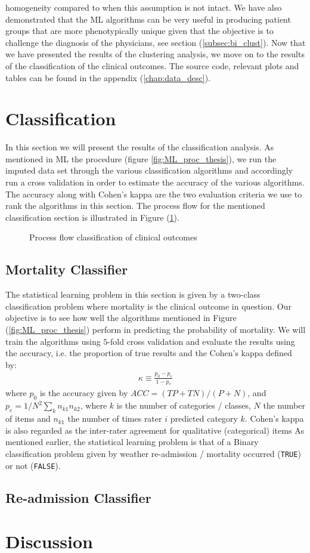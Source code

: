 \documentclass[../thesis.tex]{subfiles}
\begin{document}
homogeneity compared to when this assumption is not intact. We have also demonstrated that the ML algorithms can be very useful in producing patient groups that are more phenotypically unique given that the objective is to challenge the diagnosis of the physicians, see section (\ref{subsec:bi_clust}). Now that we have presented the results of the clustering analysis, we move on to the results of the classification of the clinical outcomes. The source code, relevant plots and tables can be found in the appendix (\ref{chap:data_desc}).

\section{Classification}

\noindent In this section we will present the results of the classification analysis. As mentioned in ML the procedure (figure \ref{fig:ML_proc_thesis}), we run the imputed data set through the various classification algorithms and accordingly run a cross validation in order to estimate the accuracy of the various algorithms. The accuracy along with Cohen’s kappa are the two evaluation criteria we use to rank the algorithms in this section. The process flow for the mentioned classification section is illustrated in Figure (\ref{fig:process_flow_classification}). 

\begin{figure}
    \centering
    
    \caption{Process flow classification of clinical outcomes}
    \label{fig:process_flow_classification}
\end{figure}

\subsection{Mortality Classifier}

\noindent The statistical learning problem in this section is given by a two-class classification problem where mortality is the clinical outcome in question. Our objective is to see how well the algorithms mentioned in Figure (\ref{fig:ML_proc_thesis}) perform in predicting the probability of mortality. We will train the algorithms using $5$-fold cross validation and evaluate the results using the accuracy, i.e. the proportion of true results and the Cohen's kappa defined by:
\begin{align}
    \kappa \equiv \frac{p_0 - p_e}{1 - p_e}
\end{align}
where $p_0$ is the accuracy given by ${\mathit  {ACC}}=({\mathit  {TP}}+{\mathit  {TN}})/(P+N)$, and $p_e = 1 / N^2 \sum_{k} n_{k1}n_{k2}$, where $k$ is the number of categories / classes, $N$ the number of items and $n_{k1}$ the number of times rater $i$ predicted category $k$. Cohen's kappa is also regarded as the inter-rater agreement for qualitative (categorical) items As mentioned earlier, the statistical learning problem is that of a Binary classification problem given by weather re-admission / mortality occurred (\texttt{TRUE}) or not (\texttt{FALSE}). 

\subsection{Re-admission Classifier}

\section{Discussion}
\end{document}
